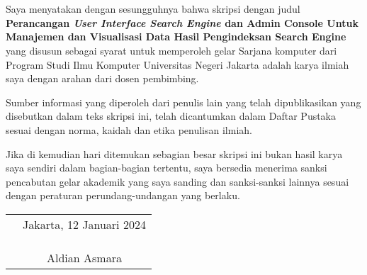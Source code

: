 \chapter*{}

Saya menyatakan dengan sesungguhnya bahwa skripsi dengan judul 	\textbf{Perancangan \emph{User Interface Search Engine} dan Admin Console Untuk Manajemen dan Visualisasi Data Hasil Pengindeksan Search Engine}   yang disusun sebagai syarat untuk memperoleh gelar Sarjana komputer dari Program Studi Ilmu Komputer Universitas Negeri Jakarta adalah karya ilmiah saya dengan arahan dari dosen pembimbing.

Sumber informasi yang diperoleh dari penulis lain yang
telah dipublikasikan yang disebutkan dalam teks skripsi ini, telah dicantumkan dalam Daftar Pustaka sesuai dengan norma, kaidah dan etika penulisan ilmiah.

Jika di kemudian hari ditemukan sebagian besar skripsi ini bukan hasil karya saya sendiri dalam bagian-bagian tertentu, saya bersedia menerima sanksi pencabutan gelar akademik yang saya sanding dan sanksi-sanksi lainnya sesuai dengan peraturan perundang-undangan yang berlaku.

\vspace{.5cm}

\begin{tabular}{p{7.5cm}c}
	&Jakarta, 12 Januari 2024\\
	&\\
	&\\
	&\\
	&Aldian Asmara
\end{tabular}